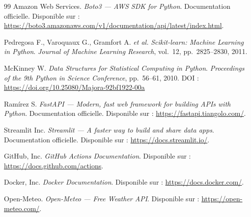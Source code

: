\documentclass[11pt]{article}
\begin{document}
\begin{thebibliography}{99}
Amazon Web Services.
\textit{Boto3 --- AWS SDK for Python}. Documentation officielle.
Disponible sur : \url{https://boto3.amazonaws.com/v1/documentation/api/latest/index.html}.

Pedregosa F., Varoquaux G., Gramfort A. \textit{et al.}
\textit{Scikit-learn: Machine Learning in Python}.
\textit{Journal of Machine Learning Research}, vol.~12, pp.~2825--2830, 2011.

McKinney W.
\textit{Data Structures for Statistical Computing in Python}.
\textit{Proceedings of the 9th Python in Science Conference}, pp.~56--61, 2010.
DOI : \url{https://doi.org/10.25080/Majora-92bf1922-00a}

Ramírez S.
\textit{FastAPI --- Modern, fast web framework for building APIs with Python}.
Documentation officielle. Disponible sur : \url{https://fastapi.tiangolo.com/}.

Streamlit Inc.
\textit{Streamlit --- A faster way to build and share data apps}.
Documentation officielle. Disponible sur : \url{https://docs.streamlit.io/}.

GitHub, Inc.
\textit{GitHub Actions Documentation}.
Disponible sur : \url{https://docs.github.com/actions}.

Docker, Inc.
\textit{Docker Documentation}.
Disponible sur : \url{https://docs.docker.com/}.

Open-Meteo.
\textit{Open-Meteo --- Free Weather API}.
Disponible sur : \url{https://open-meteo.com/}.

\end{thebibliography}
\end{document}
